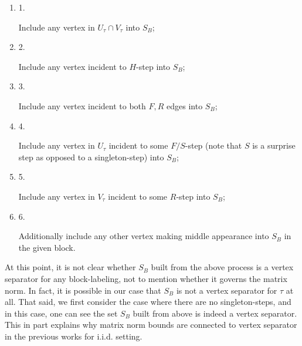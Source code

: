 \documentclass[10pt,a4paper]{article}
\begin{document}
\begin{enumerate}


\item[] 
1. 


Include any vertex in $U_{\tau}\cap V_{\tau}$ into $S_{B}$;\par





\item[] 
2. 


Include any vertex incident to $H$-step into $S_{B}$;\par





\item[] 
3. 


Include any vertex incident to both $F,R$ edges into $S_{B}$;\par





\item[] 
4. 


Include any vertex in $U_{\tau}$ incident to some $F/S$-step (note that $S$ is a surprise step as opposed to a singleton-step) into $S_{B}$;\par





\item[] 
5. 


Include any vertex in $V_{\tau}$ incident to some $R$-step into $S_{B}$;\par





\item[] 
6. 


Additionally include any other vertex making middle appearance into $S_{B}$ in the given block.\par





\end{enumerate}




At this point, it is not clear whether $S_{B}$ built from the above process is a vertex separator for any block-labeling, not to mention whether it governs the matrix norm. In fact, it is possible in our case that $S_{B}$ is not a vertex separator for $\tau$ at all. That said, we first consider the case where there are no singleton-steps, and in this case, one can see the set $S_{B}$ built from above is indeed a vertex separator. This in part explains why matrix norm bounds are connected to vertex separator in the previous works for i.i.d. setting.\par
\end{document}
